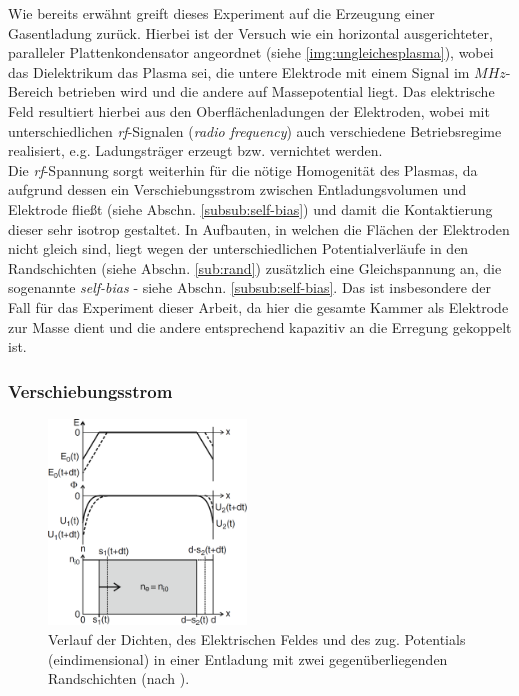 \documentclass[numbers=noenddot,a4paper]{scrartcl}
\newcommand{\tilt}[1]{\textit{#1}}
\begin{document}
			Wie bereits erwähnt greift dieses Experiment auf die Erzeugung einer Gasentladung zurück. Hierbei ist der Versuch wie ein horizontal ausgerichteter, paralleler Plattenkondensator angeordnet (siehe \ref{img:ungleichesplasma}), wobei das Dielektrikum das Plasma sei, die untere Elektrode mit einem Signal im $\unit{MHz}$-Bereich betrieben wird und die andere auf Massepotential liegt. Das elektrische Feld resultiert hierbei aus den Oberflächenladungen der Elektroden, wobei mit unterschiedlichen \tilt{rf}-Signalen (\tilt{radio frequency}) auch verschiedene Betriebsregime realisiert, e.g. Ladungsträger erzeugt bzw. vernichtet werden.\\
			Die \tilt{rf}-Spannung sorgt weiterhin für die nötige Homogenität des Plasmas, da aufgrund dessen ein Verschiebungsstrom zwischen Entladungsvolumen und Elektrode fließt (siehe Abschn. \ref{subsub:self-bias}) und damit die Kontaktierung dieser sehr isotrop gestaltet. In Aufbauten, in welchen die Flächen der Elektroden nicht gleich sind, liegt wegen der unterschiedlichen Potentialverläufe in den Randschichten (siehe Abschn. \ref{sub:rand}) zusätzlich eine Gleichspannung an, die sogenannte \tilt{self-bias} - siehe Abschn. \ref{subsub:self-bias}. Das ist insbesondere der Fall für das Experiment dieser Arbeit, da hier die gesamte Kammer als Elektrode zur Masse dient und die andere entsprechend kapazitiv an die Erregung gekoppelt ist.

				\subsubsection{Verschiebungsstrom} \label{subsub:verschieb}

					\begin{figure}
						\centering
						\includegraphics[width=0.47\textwidth,height=0.54\textwidth]{figs/verschiebpiel.png}
						\caption{Verlauf der Dichten, des Elektrischen Feldes und des zug. Potentials (eindimensional) in einer Entladung mit zwei gegenüberliegenden Randschichten (nach \cite{Piel10}).}
						\label{img:verschieb}
					\end{figure}
\end{document}
